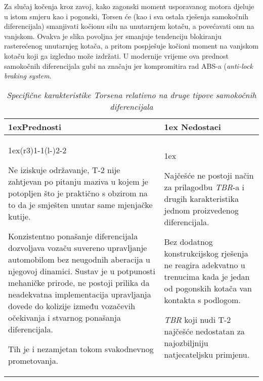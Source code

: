\documentclass[11pt]{article}
\numberwithin{equation}{section}%
\begin{document}
Za slučaj kočenja kroz zavoj, kako zagonski moment usporavanog motora djeluje u istom smjeru kao i pogonski, Torsen će (kao i sva ostala rješenja samokočnih diferencijala) smanjivati kočionu silu na unutarnjem kotaču, a povećavati onu na vanjskom. Ovakva je slika povoljna jer smanjuje tendenciju blokiranju rasterećenog unutarnjeg kotača, a pritom pospješuje kočioni moment na vanjskom kotaču koji ga izgledno može izdržati. U modernije vrijeme ova prednost samokočnih diferencijala gubi na značaju jer kompromitira rad ABS-a (\textit{anti-lock braking system}.

\begin{table}[ht]%
\begin{tabularx}{\linewidth}{>{\parskip1ex}X@{\kern4\tabcolsep}>{\parskip1ex}X}
\toprule
\hfil\bfseries Prednosti
&
\hfil\bfseries Nedostaci
\\\cmidrule(r{3\tabcolsep}){1-1}\cmidrule(l{-\tabcolsep}){2-2}

Ne iziskuje održavanje, T-2 nije zahtjevan po pitanju maziva u kojem je potopljen što je praktično s obzirom na to da je smješten unutar same mjenjačke kutije.
\par
Konzistentno ponašanje diferencijala dozvoljava vozaču suvereno upravljanje automobilom bez neugodnih aberacija u njegovoj dinamici. Sustav je u potpunosti mehaničke prirode, ne postoji prilika da neadekvatna implementacija upravljanja dovede do kolizije između vozačevih očekivanja i stvarnog ponašanja diferencijala.
\par
Tih je i nezamjetan tokom svakodnevnog prometovanja.

&

Najčešće ne postoji način za prilagodbu \textit{TBR}-a i drugih karakteristika jednom proizvedenog diferencijala.
\par
Bez dodatnog konstrukcijskog rješenja ne reagira adekvatno u trenucima kada je jedan od pogonskih kotača van kontakta s podlogom.
\par
\textit{TBR} koji nudi T-2 najčešće nedostatan za najozbiljniju natjecateljsku primjenu.

\\\bottomrule
\end{tabularx}
\caption{\textit{Specifične karakteristike Torsena relativno na druge tipove samokočnih diferencijala}}
\label{tab2}
\end{table}
\end{document}
